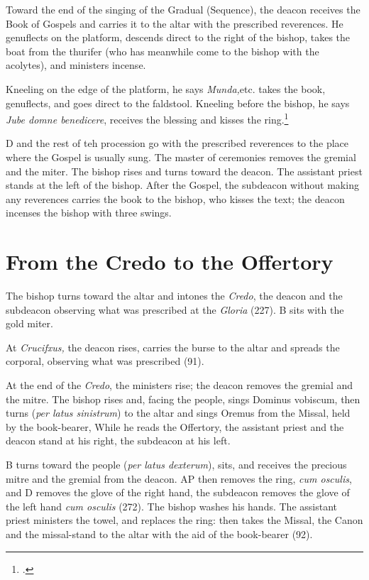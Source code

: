 \documentclass[letterpaper]{report}
\begin{document}
{\rubric Toward the end of the singing of the Gradual (Sequence), the deacon
receives the Book of Gospels and carries it to the altar with the prescribed
reverences. He genuflects on the platform, descends direct to the right of the
bishop, takes the boat from the thurifer (who has meanwhile come to the bishop
with the acolytes), and ministers incense. 

\rubric Kneeling on the edge of the platform, he says \textit{Munda,}etc. takes
the book, genuflects, and goes direct to the faldstool. Kneeling before the
bishop, he says \textit{Jube domne benedicere}, receives the blessing and
kisses the ring.\footcite[Stehle writes ``The subdeacon, the thurifer and the
acolytes kneel while the deacon the blessing.'' This requires more
research.][]{stehle}

\rubric D and the rest of teh procession go with the prescribed reverences to
the place where the Gospel is usually sung. The master of ceremonies removes
the gremial and the miter. The bishop rises and turns toward the deacon. The
assistant priest stands at the left of the bishop. After the Gospel, the
subdeacon without making any reverences carries the book to the bishop,
who kisses the text; the deacon incenses the bishop with three swings.

\section{From the Credo to the Offertory}

\rubric The bishop turns toward the altar and intones the \textit{Credo}, the
deacon and the subdeacon observing what was prescribed at the \textit{Gloria}
(227). B sits with the gold miter.

\rubric At \textit{Crucifxus,} the deacon rises, carries the burse to the altar
and spreads the corporal, observing what was prescribed (91). 

\rubric At the end of the \textit{Credo}, the ministers rise; the deacon removes the
gremial and the mitre. The bishop rises and, facing the people, sings Dominus
vobiscum, then turns (\textit{per latus sinistrum}) to the altar and sings Oremus from
the Missal, held by the book-bearer, While he reads the Offertory, the
assistant priest and the deacon stand at his right, the subdeacon at his left.

\rubric B turns toward the people (\textit{per latus dexterum}), sits, and
receives the precious mitre and the gremial from the deacon. AP then removes
the ring, \textit{cum osculis}, and D removes the glove of the right hand, the
subdeacon removes the glove of the left hand \textit{cum osculis} (272). The
bishop washes his hands. The assistant priest ministers the towel, and replaces
the ring: then takes the Missal, the Canon and the missal-stand to the altar
with the aid of the book-bearer (92).

}
\end{document}
